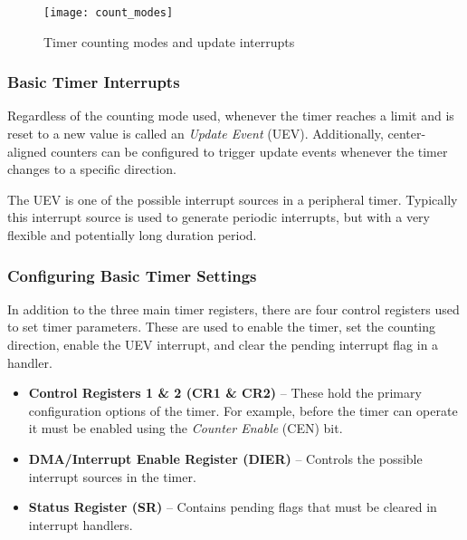 \documentclass[11pt,fleqn]{book} %
\begin{document}
    \begin{figure}[]
        \centering\texttt{[image: count\_modes]}
        \caption{Timer counting modes and update interrupts}
        \label{count_modes}
    \end{figure}
    
    \subsubsection{Basic Timer Interrupts}
    
    Regardless of the counting mode used, whenever the timer reaches a limit and is reset to a new value is called an \textit{Update Event} (UEV). Additionally, center-aligned counters can be configured to trigger update events whenever the timer changes to a specific direction. 
    
    The UEV is one of the possible interrupt sources in a peripheral timer. Typically this interrupt source is used to generate periodic interrupts, but with a very flexible and potentially long duration period.
    
    
    \subsubsection{Configuring Basic Timer Settings}
    In addition to the three main timer registers, there are four control registers used to set timer parameters. These are used to enable the timer, set the counting direction, enable the UEV interrupt, and clear the pending interrupt flag in a handler. 
    
    \begin{itemize}
        \item \textbf{Control Registers 1 \& 2 (CR1 \& CR2)} -- These hold the primary configuration options of the timer. For example, before the timer can operate it must be enabled using the \textit{Counter Enable} (CEN) bit. 
        \item\textbf{DMA/Interrupt Enable Register (DIER)} -- Controls the possible interrupt sources in the timer.
        \item\textbf{Status Register (SR)} -- Contains pending flags that must be cleared in interrupt handlers.
    \end{itemize}
\end{document}
